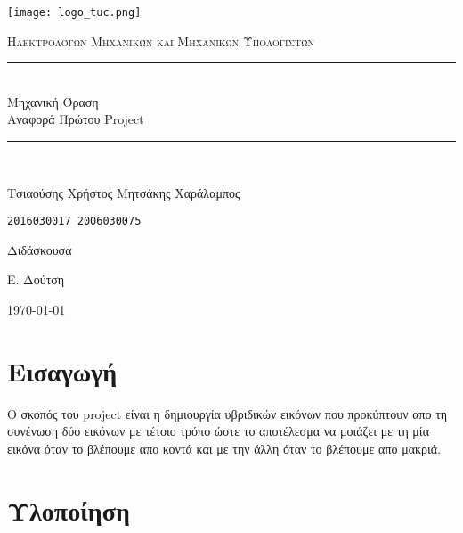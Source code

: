 \documentclass[11pt]{scrartcl} %
\begin{document}
\begin{titlepage}
    \centering
    \texttt{[image: logo\_tuc.png]}\par\vspace{1cm}
    \normalfont\normalsize
    \textsc{\textcolor[rgb]{0.66, 0.09, 0.19}{Ηλεκτρολόγων Μηχανικών και Μηχανικών Υπολογιστών}}\\ %
    \vspace{25pt} %
    \rule{\linewidth}{0.5pt}\\ %
    \vspace{20pt} %
    {\Huge Μηχανική Όραση}\\ %

    {\huge Αναφορά Πρώτου Project}\\ %
    \vspace{12pt} %
    \rule{\linewidth}{2pt}\\ %
    \vspace{12pt} %
    \vspace{2cm}

    {\LARGE{Τσιαούσης Χρήστος \hfill Μητσάκης Χαράλαμπος}
        \par
        \texttt{2016030017 \hfill 2006030075}
        \par
    }

    \vfill
    Διδάσκουσα

    Ε. Δούτση

    \vfill

    {\large \today\par}
\end{titlepage}

\newpage
\tableofcontents


\section{Εισαγωγή}

Ο σκοπός του project είναι η δημιουργία υβριδικών εικόνων που προκύπτουν απο τη συνένωση δύο εικόνων με τέτοιο τρόπο ώστε το αποτέλεσμα να μοιάζει με τη μία εικόνα όταν το βλέπουμε απο κοντά και με την άλλη όταν το βλέπουμε απο μακριά.

\section{Υλοποίηση}
\end{document}
